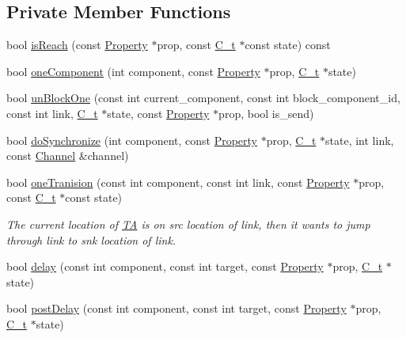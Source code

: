\subsection*{Private Member Functions}
\begin{DoxyCompactItemize}
\item 
bool \mbox{\hyperlink{classgraphsat_1_1_reachable_set_a80b137140d25e39d9c0076b4d9afa1e0}{is\+Reach}} (const \mbox{\hyperlink{classgraphsat_1_1_property}{Property}} $\ast$prop, const \mbox{\hyperlink{classgraphsat_1_1_reachable_set_a0b7981a216ec4c46be913e08d5f0cd07}{C\+\_\+t}} $\ast$const state) const
\item 
bool \mbox{\hyperlink{classgraphsat_1_1_reachable_set_a2fa079a00ee93e99ca6b2aaf1e7a03bd}{one\+Component}} (int component, const \mbox{\hyperlink{classgraphsat_1_1_property}{Property}} $\ast$prop, \mbox{\hyperlink{classgraphsat_1_1_reachable_set_a0b7981a216ec4c46be913e08d5f0cd07}{C\+\_\+t}} $\ast$state)
\item 
bool \mbox{\hyperlink{classgraphsat_1_1_reachable_set_aa22dee8c8fb1d9cdfb52f1a86deb0a4f}{un\+Block\+One}} (const int current\+\_\+component, const int block\+\_\+component\+\_\+id, const int link, \mbox{\hyperlink{classgraphsat_1_1_reachable_set_a0b7981a216ec4c46be913e08d5f0cd07}{C\+\_\+t}} $\ast$state, const \mbox{\hyperlink{classgraphsat_1_1_property}{Property}} $\ast$prop, bool is\+\_\+send)
\item 
bool \mbox{\hyperlink{classgraphsat_1_1_reachable_set_a8ce33ab357efdf1308823c7c66a590b1}{do\+Synchronize}} (int component, const \mbox{\hyperlink{classgraphsat_1_1_property}{Property}} $\ast$prop, \mbox{\hyperlink{classgraphsat_1_1_reachable_set_a0b7981a216ec4c46be913e08d5f0cd07}{C\+\_\+t}} $\ast$state, int link, const \mbox{\hyperlink{structgraphsat_1_1_channel}{Channel}} \&channel)
\item 
bool \mbox{\hyperlink{classgraphsat_1_1_reachable_set_ab581b9cb0429661ff08af533b8990ee2}{one\+Tranision}} (const int component, const int link, const \mbox{\hyperlink{classgraphsat_1_1_property}{Property}} $\ast$prop, const \mbox{\hyperlink{classgraphsat_1_1_reachable_set_a0b7981a216ec4c46be913e08d5f0cd07}{C\+\_\+t}} $\ast$const state)
\begin{DoxyCompactList}\small\item\em The current location of \mbox{\hyperlink{classgraphsat_1_1_t_a}{TA}} is on src location of link, then it wants to jump through link to snk location of link. \end{DoxyCompactList}\item 
bool \mbox{\hyperlink{classgraphsat_1_1_reachable_set_a51f36ef46b73abadf53cd04975924448}{delay}} (const int component, const int target, const \mbox{\hyperlink{classgraphsat_1_1_property}{Property}} $\ast$prop, \mbox{\hyperlink{classgraphsat_1_1_reachable_set_a0b7981a216ec4c46be913e08d5f0cd07}{C\+\_\+t}} $\ast$state)
\item 
bool \mbox{\hyperlink{classgraphsat_1_1_reachable_set_a8624402e154b2c700e99f8d5f6df23a2}{post\+Delay}} (const int component, const int target, const \mbox{\hyperlink{classgraphsat_1_1_property}{Property}} $\ast$prop, \mbox{\hyperlink{classgraphsat_1_1_reachable_set_a0b7981a216ec4c46be913e08d5f0cd07}{C\+\_\+t}} $\ast$state)
\end{DoxyCompactItemize}
